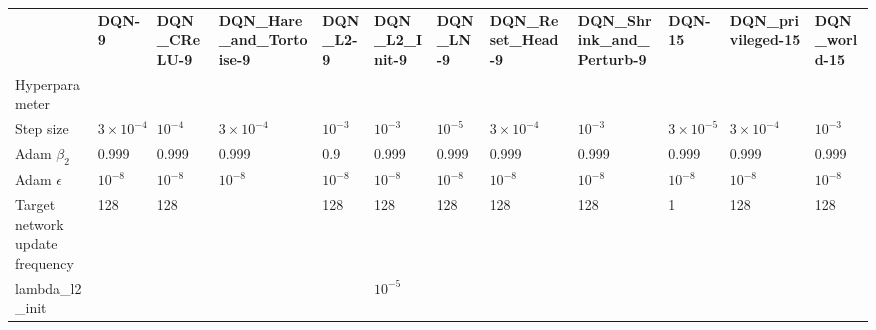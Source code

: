 \begin{tabular}{llllllllllll}
 & \bfseries DQN-9 & \bfseries DQN_CReLU-9 & \bfseries DQN_Hare_and_Tortoise-9 & \bfseries DQN_L2-9 & \bfseries DQN_L2_Init-9 & \bfseries DQN_LN-9 & \bfseries DQN_Reset_Head-9 & \bfseries DQN_Shrink_and_Perturb-9 & \bfseries DQN-15 & \bfseries DQN_privileged-15 & \bfseries DQN_world-15 \\
Hyperparameter &  &  &  &  &  &  &  &  &  &  &  \\
Step size & $3 \times 10^{-4}$ & $10^{-4}$ & $3 \times 10^{-4}$ & $10^{-3}$ & $10^{-3}$ & $10^{-5}$ & $3 \times 10^{-4}$ & $10^{-3}$ & $3 \times 10^{-5}$ & $3 \times 10^{-4}$ & $10^{-3}$ \\
Adam $\beta_2$ & 0.999 & 0.999 & 0.999 & 0.9 & 0.999 & 0.999 & 0.999 & 0.999 & 0.999 & 0.999 & 0.999 \\
Adam $\epsilon$ & $10^{-8}$ & $10^{-8}$ & $10^{-8}$ & $10^{-8}$ & $10^{-8}$ & $10^{-8}$ & $10^{-8}$ & $10^{-8}$ & $10^{-8}$ & $10^{-8}$ & $10^{-8}$ \\
Target network update frequency & 128 & 128 &  & 128 & 128 & 128 & 128 & 128 & 1 & 128 & 128 \\
lambda_l2_init &  &  &  &  & $10^{-5}$ &  &  &  &  &  &  \\
\end{tabular}
